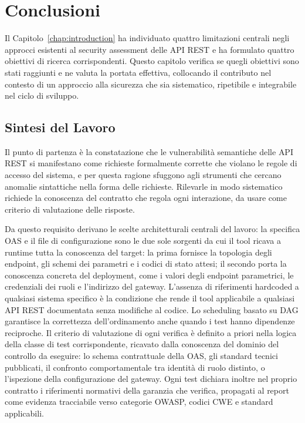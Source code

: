 \chapter{Conclusioni}\label{chap:conclusions}

Il Capitolo~\ref{chap:introduction} ha individuato quattro limitazioni centrali negli approcci esistenti al security assessment delle \gls{API} REST e ha formulato quattro obiettivi di ricerca corrispondenti. Questo capitolo verifica se quegli obiettivi sono stati raggiunti e ne valuta la portata effettiva, collocando il contributo nel contesto di un approccio alla sicurezza che sia sistematico, ripetibile e integrabile nel ciclo di sviluppo.

\section{Sintesi del Lavoro}%
\label{sec:sintesi-risoluzione}

Il punto di partenza è la constatazione che le vulnerabilità semantiche delle \gls{API} REST si manifestano come richieste formalmente corrette che violano le regole di accesso del sistema, e per questa ragione sfuggono agli strumenti che cercano anomalie sintattiche nella forma delle richieste. Rilevarle in modo sistematico richiede la conoscenza del contratto che regola ogni interazione, da usare come criterio di valutazione delle risposte.

Da questo requisito derivano le scelte architetturali centrali del lavoro: la specifica \gls{OAS} e il file di configurazione sono le due sole sorgenti da cui il tool ricava a runtime tutta la conoscenza del target: la prima fornisce la topologia degli endpoint, gli schemi dei parametri e i codici di stato attesi; il secondo porta la conoscenza concreta del deployment, come i valori degli endpoint parametrici, le credenziali dei ruoli e l'indirizzo del gateway. L'assenza di riferimenti hardcoded a qualsiasi sistema specifico è la condizione che rende il tool applicabile a qualsiasi \gls{API} REST documentata senza modifiche al codice. Lo scheduling basato su \gls{DAG} garantisce la correttezza dell'ordinamento anche quando i test hanno dipendenze reciproche. Il criterio di valutazione di ogni verifica è definito a priori nella logica della classe di test corrispondente, ricavato dalla conoscenza del dominio del controllo da eseguire: lo schema contrattuale della \gls{OAS}, gli standard tecnici pubblicati, il confronto comportamentale tra identità di ruolo distinto, o l'ispezione della configurazione del gateway. Ogni test dichiara inoltre nel proprio contratto i riferimenti normativi della garanzia che verifica, propagati al report come evidenza tracciabile verso categorie \gls{OWASP}, codici \gls{CWE} e standard applicabili.

